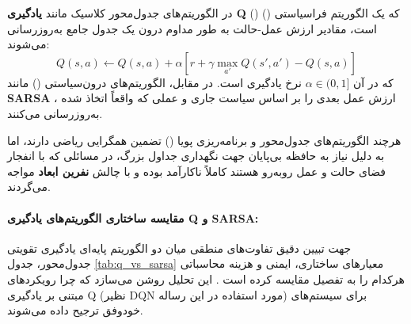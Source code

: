 \documentclass[oneside,openany,phd]{TMU-Thesis}
\begin{document}
در الگوریتم‌های جدول‌محور کلاسیک مانند \textbf{یادگیری Q} () \cite{watkins1992q} که یک الگوریتم فراسیاستی () است، مقادیر ارزش عمل-حالت به طور مداوم درون یک جدول جامع به‌روزرسانی می‌شوند:
$$Q(s, a) \leftarrow Q(s, a) + \alpha \left[ r + \gamma \max_{a'} Q(s', a') - Q(s, a) \right]$$
که در آن $\alpha \in (0, 1]$ نرخ یادگیری است. در مقابل، الگوریتم‌های درون‌سیاستی () مانند \textbf{SARSA} \cite{rummery1994on-line}، ارزش عمل بعدی را بر اساس سیاست جاری و عملی که واقعاً اتخاذ شده به‌روزرسانی می‌کنند. 

هرچند الگوریتم‌های جدول‌محور و برنامه‌ریزی پویا () تضمین همگرایی ریاضی دارند، اما به دلیل نیاز به حافظه بی‌پایان جهت نگهداری جداول بزرگ، در مسائلی که با انفجار فضای حالت و عمل روبه‌رو هستند کاملاً ناکارآمد بوده و با چالش \textbf{نفرین ابعاد} مواجه می‌گردند.

\paragraph{مقایسه ساختاری الگوریتم‌های یادگیری Q و SARSA:}
جهت تبیین دقیق تفاوت‌های منطقی میان دو الگوریتم پایه‌ای یادگیری تقویتی جدول‌محور، جدول \ref{tab:q_vs_sarsa} معیارهای ساختاری، ایمنی و هزینه محاسباتی هرکدام را به تفصیل مقایسه کرده است \cite{sutton2018reinforcement}. این تحلیل روشن می‌سازد که چرا رویکردهای مبتنی بر یادگیری Q (نظیر DQN مورد استفاده در این رساله) برای سیستم‌های خودوفق ترجیح داده می‌شوند.

\begin{table}[h!]
\centering
\caption{مقایسه تطبیقی الگوریتم‌های جدول‌محور Q-Learning و SARSA}
\label{tab:q_vs_sarsa}
\end{table}
\end{document}
